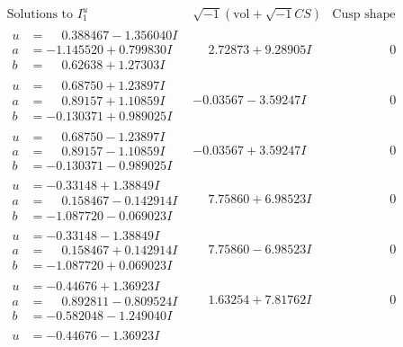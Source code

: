 \documentclass[1p]{elsarticle_modified}
\theoremstyle{definition}
\newcommand{\I}{\sqrt{-1}}
\begin{document}
$$\begin{array}{c|c|c}
\text{Solutions to }I^u_{1}& \I (\text{vol} + \sqrt{-1}CS) & \text{Cusp shape}\\
 \hline 
\begin{aligned}
u &= \phantom{-}0.388467 - 1.356040 I \\
a &= -1.145520 + 0.799830 I \\
b &= \phantom{-}0.62638 + 1.27303 I\end{aligned}
 & \phantom{-}2.72873 + 9.28905 I & \phantom{-0.000000 } 0 \\ \hline\begin{aligned}
u &= \phantom{-}0.68750 + 1.23897 I \\
a &= \phantom{-}0.89157 + 1.10859 I \\
b &= -0.130371 + 0.989025 I\end{aligned}
 & -0.03567 - 3.59247 I & \phantom{-0.000000 } 0 \\ \hline\begin{aligned}
u &= \phantom{-}0.68750 - 1.23897 I \\
a &= \phantom{-}0.89157 - 1.10859 I \\
b &= -0.130371 - 0.989025 I\end{aligned}
 & -0.03567 + 3.59247 I & \phantom{-0.000000 } 0 \\ \hline\begin{aligned}
u &= -0.33148 + 1.38849 I \\
a &= \phantom{-}0.158467 - 0.142914 I \\
b &= -1.087720 - 0.069023 I\end{aligned}
 & \phantom{-}7.75860 + 6.98523 I & \phantom{-0.000000 } 0 \\ \hline\begin{aligned}
u &= -0.33148 - 1.38849 I \\
a &= \phantom{-}0.158467 + 0.142914 I \\
b &= -1.087720 + 0.069023 I\end{aligned}
 & \phantom{-}7.75860 - 6.98523 I & \phantom{-0.000000 } 0 \\ \hline\begin{aligned}
u &= -0.44676 + 1.36923 I \\
a &= \phantom{-}0.892811 - 0.809524 I \\
b &= -0.582048 - 1.249040 I\end{aligned}
 & \phantom{-}1.63254 + 7.81762 I & \phantom{-0.000000 } 0 \\ \hline\begin{aligned}
u &= -0.44676 - 1.36923 I \\

\end{aligned}
\end{array}$$
\end{document}
